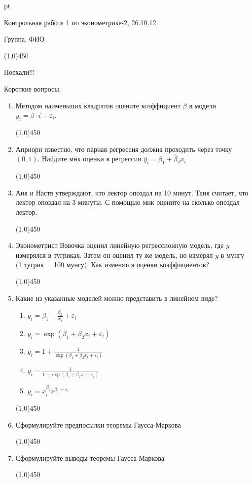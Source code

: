 \documentclass[pdftex,12pt,a4paper]{article}
\def \hb{\hat{\beta}}
\def \hy{\hat{y}}
\def \e{\varepsilon}
\begin{document}
 pt %

\newcommand{\here}{\vspace{1pt}\begin{center}
\line(1,0){450}
\end{center}}

Контрольная работа 1 по эконометрике-2, 26.10.12.

Группа, ФИО\here


Поехали!!!

Короткие вопросы:

\begin{enumerate}

\item Методом наименьших квадратов оцените коэффициент $\beta$ в модели $y_i=\beta\cdot i +\varepsilon_i$.
\here

\item Априори известно, что парная регрессия должна проходить через точку $(0,1)$. Найдите мнк оценки в регрессии $\hy_i=\hb_1+\hb_2x_i$
\here


\item Аня и Настя утверждают, что лектор опоздал на 10 минут. Таня считает, что лектор опоздал на 3 минуты. С помощью мнк оцените на сколько опоздал лектор. 
\here

\item Эконометрист Вовочка оценил линейную регрессионную модель, где $y$ измерялся в тугриках. Затем он оценил ту же модель, но измерял $y$ в мунгу (1 тугрик = 100 мунгу). Как изменятся оценки коэффициентов?
\here

\item Какие из указанные моделей можно представить в линейном виде?
\begin{enumerate}
\item $y_i=\beta_1+\frac{\beta_2}{x_i}+\e_i$
\item $y_i=\exp(\beta_1+\beta_2 x_i+\e_i)$
\item $y_i=1+\frac{1}{\exp(\beta_1+\beta_2 x_i+\e_i)}$
\item $y_i=\frac{1}{1+\exp(\beta_1+\beta_2 x_i+\e_i)}$
\item $y_i=x_i^{\beta_2}e^{\beta_1+\e_i}$
\end{enumerate}
\here

\item Сформулируйте предпосылки теоремы Гаусса-Маркова
\here

\item Сформулируйте выводы теоремы Гаусса-Маркова
\here


\end{enumerate}
\end{document}
